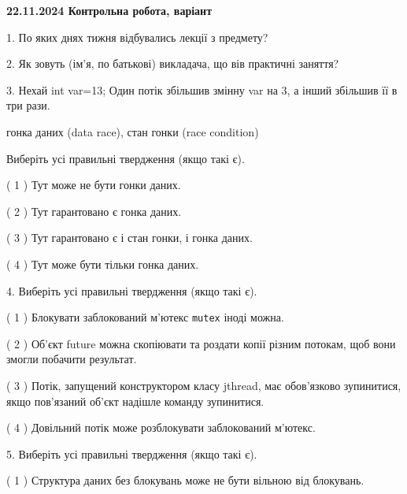 \documentclass[12pt, ukrainian]{article}
\def\code#1{\Verb!#1!}
\begin{document}
\vspace{4mm}
\newpage
\begin {large}

\textbf{22.11.2024 Контрольна робота, варіант  }\par


{
1. По яких днях тижня відбувались лекції з предмету?



\vspace{5mm}
2. Як зовуть (ім'я, по батькові) викладача, що вів практичні заняття?



\vspace{5mm}
3. Нехай int var=13; Один потік збільшив змінну var на 3, а інший збільшив її в три рази.

гонка даних (data race), стан гонки (race condition)

Виберіть усі правильні твердження (якщо такі є).\par
\vspace{2mm}
( 1 ) Тут може не бути гонки даних.%

( 2 ) Тут гарантовано є гонка даних.%

( 3 ) Тут гарантовано є і стан гонки, і гонка даних.%

( 4 ) Тут може бути тільки гонка даних.%


\vspace{5mm}
4. Виберіть усі правильні твердження (якщо такі є).\par
\vspace{2mm}

( 1 ) Блокувати заблокований м’ютекс  \code{mutex} іноді можна.%

( 2 ) Об’єкт future можна скопіювати та роздати копії різним потокам, щоб вони змогли побачити результат.%

( 3 ) Потік, запущений конструктором класу jthread, має обов’язково зупинитися, якщо пов’язаний об’єкт надішле команду зупинитися.%

( 4 ) Довільний потік може розблокувати заблокований м’ютекс.%


\vspace{5mm}
5. Виберіть усі правильні твердження (якщо такі є).\par
\vspace{2mm}

( 1 ) Структура даних без блокувань може не бути вільною від блокувань.%

}
\end{large}
\end{document}
